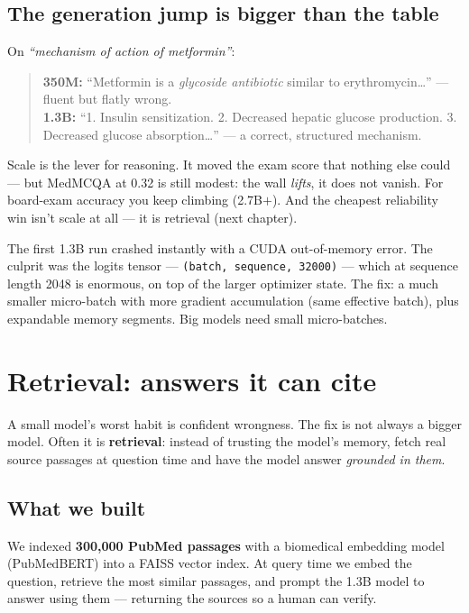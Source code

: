 \section{The generation jump is bigger than the table}
On \emph{``mechanism of action of metformin''}:
\begin{quote}\small
\textbf{350M:} ``Metformin is a \emph{glycoside antibiotic} similar to erythromycin\ldots'' --- fluent but
flatly wrong.\\[3pt]
\textbf{1.3B:} ``1. Insulin sensitization. 2. Decreased hepatic glucose production. 3. Decreased glucose
absorption\ldots'' --- a correct, structured mechanism.
\end{quote}

\begin{lesson}
Scale is the lever for reasoning. It moved the exam score that nothing else could --- but MedMCQA at 0.32 is
still modest: the wall \emph{lifts}, it does not vanish. For board-exam accuracy you keep climbing
(2.7B$+$). And the cheapest reliability win isn't scale at all --- it is retrieval (next chapter).
\end{lesson}

\begin{gotcha}
The first 1.3B run crashed instantly with a CUDA out-of-memory error. The culprit was the logits tensor ---
\texttt{(batch, sequence, 32000)} --- which at sequence length 2048 is enormous, on top of the larger optimizer
state. The fix: a much smaller micro-batch with more gradient accumulation (same effective batch), plus
expandable memory segments. Big models need small micro-batches.
\end{gotcha}

\chapter{Retrieval: answers it can cite}

A small model's worst habit is confident wrongness. The fix is not always a bigger model. Often it is
\textbf{retrieval}: instead of trusting the model's memory, fetch real source passages at question time and
have the model answer \emph{grounded in them}.

\section{What we built}
We indexed \textbf{300{,}000 PubMed passages} with a biomedical embedding model (PubMedBERT) into a FAISS
vector index. At query time we embed the question, retrieve the most similar passages, and prompt the 1.3B
model to answer using them --- returning the sources so a human can verify.

